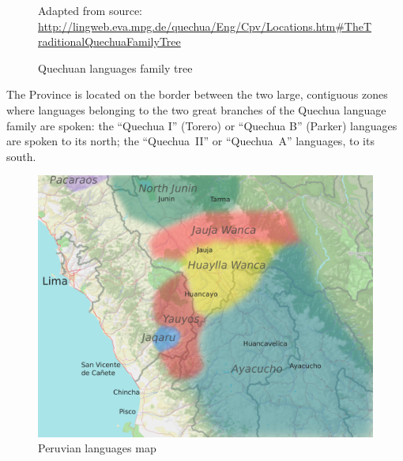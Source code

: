 \begin{figure}[!ht]
{}
\caption{Quechuan languages family tree}\label{Fig1}
\raggedright
{\scriptsize Adapted from source: \url{http://lingweb.eva.mpg.de/quechua/Eng/Cpv/Locations.htm#TheTraditionalQuechuaFamilyTree}}
\end{figure}

The Province is located on the border between the two large, contiguous zones where languages belonging to the two great branches of the Quechua language family are spoken: the “Quechua I” (Torero) or “Quechua B” (Parker) languages are spoken to its north; the “Quechua~II” or “Quechua~A” languages, to its south. 

\begin{figure}

\includegraphics[width=\textwidth]{figures/largerregion2.pdf}
\caption{Peruvian languages map}\label{Figcomp}
\raggedright
\end{figure}

